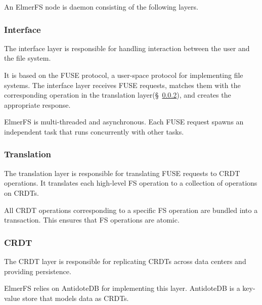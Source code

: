 \documentclass[sigconf,anonymous,10pt]{acmart}
\begin{document}
An ElmerFS node is daemon consisting of the following layers.

\subsubsection{Interface}

The interface layer is responsible for handling interaction between the user
and the file system.

It is based on the FUSE protocol, a user-space protocol for implementing
file systems. The interface layer receives FUSE requests,
matches them with the corresponding operation in
the translation layer(\S~\ref{sec:transaction_layer}), and creates the appropriate response.

ElmerFS is multi-threaded and asynchronous. Each FUSE request spawns an
independent task that runs concurrently with other tasks.

\subsubsection{Translation}
\label{sec:transaction_layer}
The translation layer is responsible for translating FUSE requests
to CRDT operations. It translates each high-level FS operation
to a collection of operations on CRDTs.

All CRDT operations corresponding to a specific FS operation are bundled into
a transaction. This ensures that FS operations are atomic.

\subsubsection{CRDT}

The CRDT layer is responsible for replicating CRDTs across data centers
and providing persistence.

ElmerFS relies on AntidoteDB for implementing this layer.
AntidoteDB is a key-value store that models data as CRDTs.
\end{document}
